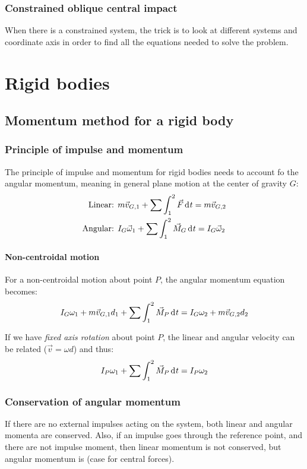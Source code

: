 \documentclass[10pt, twocolumn]{article}
\begin{document}
\subsubsection{Constrained oblique central impact}
When there is a constrained system, the trick is to look at different systems and coordinate axis in order to find all the equations needed to solve the problem.


\section{Rigid bodies}
\subsection{Momentum method for a rigid body}
\subsubsection{Principle of impulse and momentum}
The principle of impulse and momentum for rigid bodies needs to account fo the angular momentum, meaning in general plane motion at the center of gravity \(G\):
\begin{align*}
  \text{Linear: }  & m\vec{v}_{G,1} + \sum{\int_1^2{\vec{F} \,\mathrm{d}^{} t}} = m\vec{v}_{G,2}         \\
  \text{Angular: } & I_G\vec{\omega}_1 + \sum{\int_1^2{\vec{M}_G \,\mathrm{d}^{} t}} = I_G\vec{\omega}_2
\end{align*}

\paragraph{Non-centroidal motion}
For a non-centroidal motion about point \(P\), the angular momentum equation becomes:
\[
  I_G\omega_1 + m\vec{v}_{G,1}d_1 + \sum{\int_1^2{\vec{M}_P \,\mathrm{d}^{} t}} = I_G\omega_2 + m\vec{v}_{G,2}d_2
\]

If we have \emph{fixed axis rotation} about point \(P\), the linear and angular velocity can be related (\(\vec{v} = \omega d\)) and thus:
\[
  I_P\omega_1 + \sum{\int_1^2{\vec{M}_P \,\mathrm{d}^{} t}} = I_P\omega_2
\]


\subsubsection{Conservation of angular momentum}
If there are no external impulses acting on the system, both linear and angular momenta are conserved.
Also, if an impulse goes through the reference point, and there are not impulse moment, then linear momentum is not conserved, but angular momentum is (case for central forces).
\end{document}
